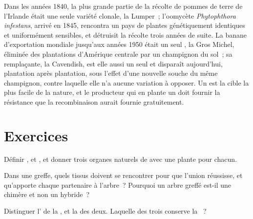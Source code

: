 \begin{example}\label{ex:b2:asexual-reproduction:monoculture}
Dans les années 1840, la plus grande partie de la récolte de pommes de
terre de l'Irlande était une seule variété clonale, la Lumper~; l'oomycète
\emph{Phytophthora infestans}, arrivé en 1845, rencontra un pays de
plantes génétiquement identiques et uniformément sensibles, et détruisit
la récolte trois années de suite. La banane d'exportation mondiale
jusqu'aux années 1950 était un seul , la Gros Michel, éliminée des
plantations d'Amérique centrale par un champignon du sol~; sa
remplaçante, la Cavendish, est elle aussi un seul  et disparaît
aujourd'hui, plantation après plantation, sous l'effet d'une nouvelle
souche du même champignon, contre laquelle elle n'a aucune variation à
opposer. Un  est la cible la plus facile de la nature, et le
producteur qui en plante un doit fournir la résistance que la
recombinaison aurait fournie gratuitement.
\end{example}

\section{Exercices}

\begin{exercise}[$\star$]\label{exo:b2:asexual-reproduction:1}
Définir ,  et , et donner trois organes naturels de
 avec une plante pour chacun.
\end{exercise}

\begin{exercise}[$\star$]\label{exo:b2:asexual-reproduction:2}
Dans une greffe, quels tissus doivent se rencontrer pour que l'union
réussisse, et qu'apporte chaque partenaire à l'arbre~? Pourquoi un
arbre greffé est-il une chimère et non un hybride~?
\end{exercise}

\begin{exercise}[$\star$]\label{exo:b2:asexual-reproduction:3}
Distinguer l' de la , et la
 des deux. Laquelle des trois conserve la ~?
\end{exercise}

